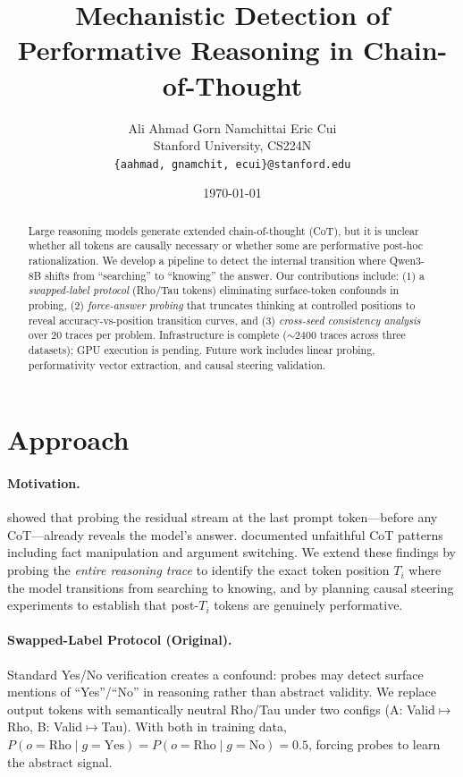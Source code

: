 \documentclass[11pt]{article}
\title{Mechanistic Detection of Performative Reasoning in Chain-of-Thought}
\author{
  Ali Ahmad \quad Gorn Namchittai \quad Eric Cui \\
  Stanford University, CS224N \\
  \texttt{\{aahmad, gnamchit, ecui\}@stanford.edu}
}
\date{\today}
\begin{document}
\maketitle

\begin{abstract}
Large reasoning models generate extended chain-of-thought (CoT), but it is unclear whether all tokens are causally necessary or whether some are performative post-hoc rationalization. We develop a pipeline to detect the internal transition where Qwen3-8B \citep{qwen3} shifts from ``searching'' to ``knowing'' the answer. Our contributions include: (1) a \emph{swapped-label protocol} (Rho/Tau tokens) eliminating surface-token confounds in probing, (2) \emph{force-answer probing} that truncates thinking at controlled positions to reveal accuracy-vs-position transition curves, and (3) \emph{cross-seed consistency analysis} over 20 traces per problem. Infrastructure is complete (${\sim}2400$ traces across three datasets); GPU execution is pending. Future work includes linear probing, performativity vector extraction, and causal steering validation.
\end{abstract}

\section{Approach}

\paragraph{Motivation.}
\citet{cox2025posthoc} showed that probing the residual stream at the last prompt token---before any CoT---already reveals the model's answer. \citet{arcuschin2025cot} documented unfaithful CoT patterns including fact manipulation and argument switching. We extend these findings by probing the \emph{entire reasoning trace} to identify the exact token position $T_i$ where the model transitions from searching to knowing, and by planning causal steering experiments to establish that post-$T_i$ tokens are genuinely performative.

\paragraph{Swapped-Label Protocol (Original).}
Standard Yes/No verification creates a confound: probes may detect surface mentions of ``Yes''/``No'' in reasoning rather than abstract validity. We replace output tokens with semantically neutral Rho/Tau under two configs (A: Valid$\mapsto$Rho, B: Valid$\mapsto$Tau). With both in training data, $P(o{=}\text{Rho} \mid g{=}\text{Yes}) = P(o{=}\text{Rho} \mid g{=}\text{No}) = 0.5$, forcing probes to learn the abstract signal.
\end{document}
